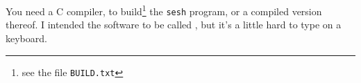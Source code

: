\documentclass[final]{article}
\def\Backslash{$\backslash$}
\begin{document}






You need a C compiler, to build\footnote{see the file
  \texttt{BUILD.txt}} the \verb/sesh/ program, or a compiled version
thereof.  I intended the software to be called , but it's a little hard to type on a keyboard.
\end{document}
